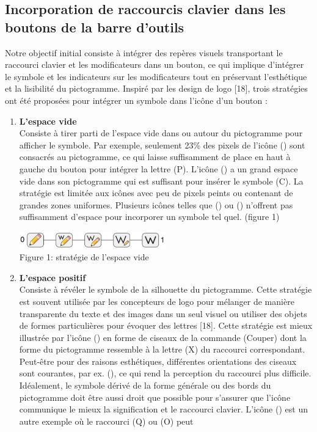 \documentclass[12pt,a4paper]{article}
\begin{document}
\subsection{Incorporation de raccourcis clavier dans les boutons de la barre d’outils}
Notre objectif initial consiste à intégrer des repères visuels transportant le raccourci clavier et les modificateurs dans un bouton, ce qui implique d'intégrer le symbole et les indicateurs sur les
modificateurs tout en préservant l'esthétique et la lisibilité du pictogramme.
Inspiré par les design de logo [18], trois stratégies ont été proposées pour intégrer un symbole dans l'icône d'un bouton \cite{3} :
\begin{enumerate}
\item {\large \textbf{L’espace vide}}\\
Consiste à tirer parti de l'espace vide dans ou autour du pictogramme pour afficher le symbole. Par exemple, seulement 23\% des pixels de l’icône () sont consacrés au pictogramme, ce qui laisse suffisamment de place en haut à gauche du bouton pour intégrer la lettre (P). L'icône () a un grand
espace vide dans son pictogramme qui est suffisant pour insérer le symbole (C). La stratégie est limitée aux icônes avec peu de pixels peints ou contenant de grandes zones uniformes. Plusieurs icônes telles que () ou () n’offrent pas suffisamment d'espace pour incorporer un symbole tel quel.
(figure 1)
\begin{center}
	\includegraphics[width=0.5\textwidth]{T1.png}\\
	Figure 1: stratégie de l’espace vide
\end{center}
\item {\large \textbf{L’espace positif}}\\
Consiste à révéler le symbole de la silhouette du pictogramme. Cette stratégie est souvent utilisée par les concepteurs de logo pour mélanger de manière transparente du texte et des images dans un seul visuel ou utiliser des objets de formes particulières pour évoquer des lettres [18]. Cette stratégie est mieux illustrée par l'icône () en forme de ciseaux de la commande (Couper) dont la forme du
pictogramme ressemble à la lettre (X) du raccourci correspondant. Peut-être pour des raisons esthétiques, différentes orientations des ciseaux sont courantes, par ex. (), ce qui rend la perception
du raccourci plus difficile. Idéalement, le symbole dérivé de la forme générale ou des  bords du pictogramme doit être aussi droit que possible pour s'assurer que l'icône communique le mieux la signification et le raccourci clavier. L'icône () est un autre exemple où le raccourci (Q) ou (O) peut

\end{enumerate}
\end{document}
